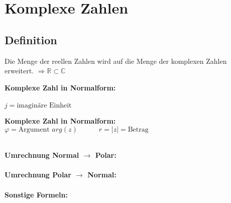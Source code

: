 \section{Komplexe Zahlen}
\subsection{Definition}
	Die Menge der reellen Zahlen wird auf die Menge der komplexen Zahlen erweitert. $\Rightarrow \mathbb{R} \subset \mathbb{C}$\\
	
	\begin{minipage}[t]{0.5\textwidth}
		\textbf{Komplexe Zahl in Normalform:}\\[3pt]
		\\
		$j = \text{imaginäre Einheit}$
	\end{minipage}
	\begin{minipage}[t]{0.5\textwidth}
		\textbf{Komplexe Zahl in Normalform:}\\[3pt]
		$\varphi = \text{Argument } arg(z) \quad\qquad r = \left| z \right| = \text{Betrag}$
	\end{minipage}\\[3pt]
	\textbf{Umrechnung Normal $\rightarrow$ Polar:}\\[3pt]
	\\[3pt]
	\textbf{Umrechnung Polar $\rightarrow$ Normal:}\\[3pt]
	\\[3pt]
	\textbf{Sonstige Formeln:}\\[3pt]
